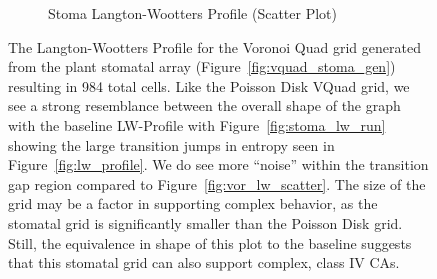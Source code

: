 \documentclass[a4paper,11pt,twoside]{report}
\begin{document}
\begin{figure}[htp]
\begin{subfigure}[t]{0.6\textwidth}
  \caption{Stoma Langton-Wootters Profile (Scatter Plot)}
  \label{fig:stoma_lw_scatter}
  \end{subfigure}
\caption[Stoma Langton-Wootters Profile]{
  The Langton-Wootters Profile for the Voronoi Quad grid generated from the plant stomatal array (Figure~\ref{fig:vquad_stoma_gen}) resulting in 984 total cells. Like the Poisson Disk VQuad grid, we see a strong resemblance between the overall shape of the graph with the baseline LW-Profile with Figure~\ref{fig:stoma_lw_run} showing the large transition jumps in entropy seen in Figure~\ref{fig:lw_profile}. We do see more ``noise'' within the transition gap region compared to Figure~\ref{fig:vor_lw_scatter}. The size of the grid may be a factor in supporting complex behavior, as the stomatal grid is significantly smaller than the Poisson Disk grid. Still, the equivalence in shape of this plot to the baseline suggests that this stomatal grid can also support complex, class IV CAs.
}
\label{fig:stoma_lw_profile}
\end{figure}
\end{document}
